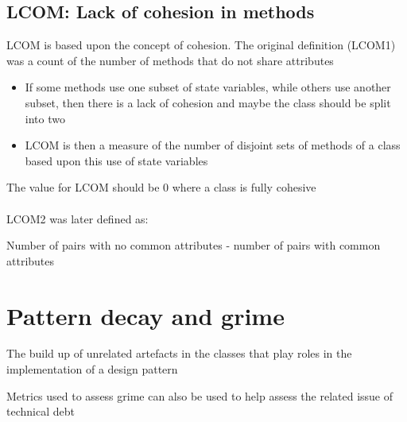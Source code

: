 \documentclass{article}[18pt]
\begin{document}
\subsection{LCOM: Lack of cohesion in methods}
LCOM is based upon the concept of cohesion. The original definition (LCOM1) was a count of the number of methods that do not share attributes
\begin{itemize}
	\item If some methods use one subset of state variables, while others use another subset, then there is a lack of cohesion and maybe the class should be split into two
	\item LCOM is then a measure of the number of disjoint sets of methods of a class based upon this use of state variables
\end{itemize}
The value for LCOM should be 0 where a class is fully cohesive\\
\\
LCOM2 was later defined as:
\begin{center}
	Number of pairs with no common attributes - number of pairs with common attributes
\end{center}
\section{Pattern decay and grime}
\begin{definition}[Grime]
	The build up of unrelated artefacts in the classes that play roles in the implementation of a design pattern
\end{definition}
Metrics used to assess grime can also be used to help assess the related issue of technical debt
\end{document}
